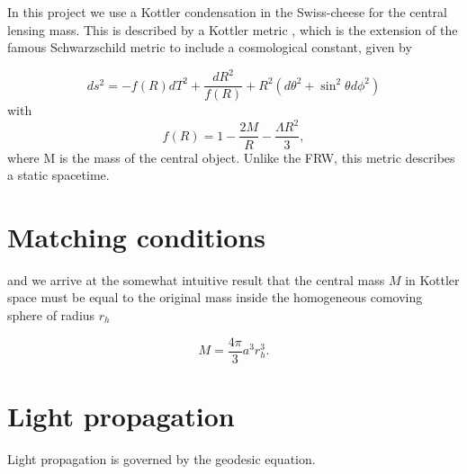 In this project we use a Kottler condensation in the Swiss-cheese for the central lensing mass. This is described by a Kottler metric \citep{kottler1918physikalischen}, which is the extension of the famous Schwarzschild metric to include a cosmological constant, given by

\begin{equation}
  ds^2 = -f(R)dT^2 + \frac{dR^2}{f(R)} + R^2(d\theta^2 + \sin^2 \theta d\phi^2)
  \label{eq:kottler-metric}
\end{equation}
with
\begin{equation}
  f(R) = 1-\frac{2M}{R} - \frac{\Lambda R^2}{3},
  \label{eq:kottler-metric-f}
\end{equation}
where M is the mass of the central object. Unlike the FRW, this metric describes a static spacetime. 

\section{Matching conditions}

and we arrive at the somewhat intuitive result that the central mass $M$ in Kottler space must be equal to the original mass inside the homogeneous comoving sphere of radius $r_h$

\begin{equation}
  M = \frac{4\pi}{3} a^3 r_h^3. 
\end{equation}


\section{Light propagation}

Light propagation is governed by the geodesic equation. 